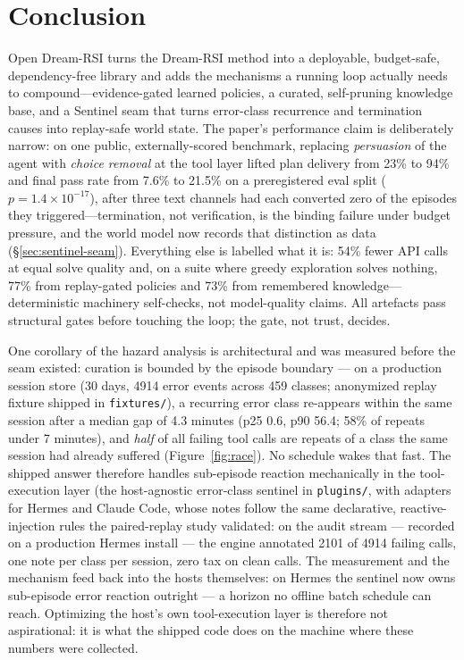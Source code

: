\documentclass[11pt,a4paper]{article}
\begin{document}
\section{Conclusion}

Open Dream-RSI turns the Dream-RSI method into a deployable, budget-safe,
dependency-free library and adds the mechanisms a running loop actually
needs to compound---evidence-gated learned policies, a curated,
self-pruning knowledge base, and a Sentinel seam that turns error-class
recurrence and termination causes into replay-safe world state. The paper's
performance claim is deliberately narrow: on one public, externally-scored
benchmark, replacing \emph{persuasion} of the agent with \emph{choice
removal} at the tool layer lifted plan delivery from 23\% to 94\% and final
pass rate from 7.6\% to 21.5\% on a preregistered eval split
($p{=}1.4{\times}10^{-17}$), after three text channels had each converted
zero of the episodes they triggered---termination, not verification, is the
binding failure under budget pressure, and the world model now records that
distinction as data (\S\ref{sec:sentinel-seam}). Everything else is
labelled what it is: 54\% fewer API calls at equal solve quality and, on a
suite where greedy exploration solves nothing, 77\% from replay-gated
policies and 73\% from remembered knowledge---deterministic machinery
self-checks, not model-quality claims. All artefacts pass structural gates
before touching the loop; the gate, not trust, decides.

One corollary of the hazard analysis is architectural and was measured
before the seam existed: curation is bounded by the episode boundary ---
on a production session store (30 days, 4914 error events across 459
classes; anonymized replay fixture shipped in \texttt{fixtures/}), a
recurring error class re-appears within the same session after a median gap
of 4.3 minutes (p25 0.6, p90 56.4; 58\% of repeats under 7 minutes), and
\emph{half} of all failing tool calls are repeats of a class the same
session had already suffered (Figure~\ref{fig:race}). No schedule wakes
that fast. The shipped answer therefore handles sub-episode reaction
mechanically in the
tool-execution layer (the host-agnostic error-class sentinel in
\texttt{plugins/}, with adapters for Hermes and Claude Code, whose notes
follow the same declarative, reactive-injection rules the paired-replay
study validated: on the audit stream --- recorded on a production Hermes install
--- the engine annotated 2101 of 4914 failing calls, one note per class per
session, zero tax on clean calls. The measurement and the mechanism feed
back into the hosts themselves: on Hermes the sentinel now owns sub-episode
error reaction outright --- a horizon no offline batch schedule can reach.
Optimizing the host's own tool-execution layer is therefore not aspirational: it is what the shipped
code does on the machine where these numbers were collected.
\end{document}
